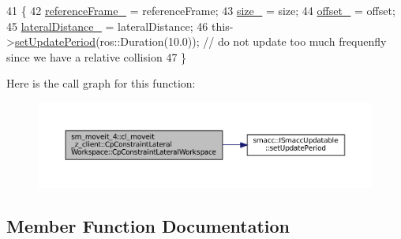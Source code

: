 \begin{DoxyCode}
41             \{
42                 \hyperlink{classsm__moveit__4_1_1cl__moveit__z__client_1_1CpConstraintLateralWorkspace_a69be978ebfd12ba0ada5d4ccf4333a06}{referenceFrame\_} = referenceFrame;
43                 \hyperlink{classsm__moveit__4_1_1cl__moveit__z__client_1_1CpConstraintLateralWorkspace_a35fb6ec0933eff1c2e4a7930b9815fcb}{size\_} = size;
44                 \hyperlink{classsm__moveit__4_1_1cl__moveit__z__client_1_1CpConstraintLateralWorkspace_a511cfdaa29f05d8b81a3c53b7241c51e}{offset\_} = offset;
45                 \hyperlink{classsm__moveit__4_1_1cl__moveit__z__client_1_1CpConstraintLateralWorkspace_afe12f95ff8a79564f4f7d944b2c3cf1d}{lateralDistance\_} = lateralDistance;
46                 this->\hyperlink{classsmacc_1_1ISmaccUpdatable_a88f3b092a81b2d8810a9776c8c69855b}{setUpdatePeriod}(ros::Duration(10.0)); \textcolor{comment}{// do not update too much
       frequenfly since we have a relative collision}
47             \}
\end{DoxyCode}
Here is the call graph for this function\+:
\nopagebreak
\begin{figure}[H]
\begin{center}
\leavevmode
\includegraphics[width=350pt]{classsm__moveit__4_1_1cl__moveit__z__client_1_1CpConstraintLateralWorkspace_a698854121e40c7c12ef8fce6f684cfea_cgraph}
\end{center}
\end{figure}


\subsection{Member Function Documentation}
\mbox{\label{classsm__moveit__4_1_1cl__moveit__z__client_1_1CpConstraintLateralWorkspace_ac27089379dc98fbecf699b18e0797aba}} 
